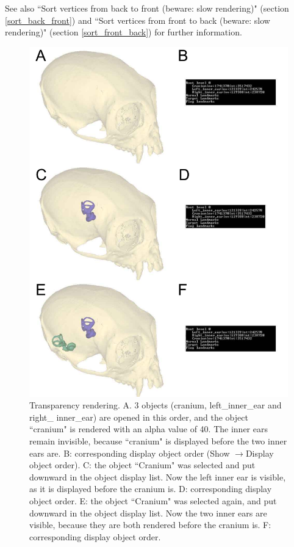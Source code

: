 See also ``Sort vertices from back to front (beware: slow rendering)"  (section \ref{sort_back_front}) and ``Sort vertices from front to back (beware: slow rendering)" (section \ref{sort_front_back}) for further information.\\

\begin{figure}
  \centering
  \includegraphics[scale=0.4]{images/Transparency/Transparency.pdf} 
	\caption{Transparency rendering. A. 3 objects (cranium, left\_inner\_ear and right\_
inner\_ear) are opened in this order, and the object ``cranium" is rendered with an alpha value of 40.
The inner ears remain invisible, because ``cranium" is displayed before the two inner ears are. B: corresponding display object order (Show $\rightarrow$Display
object order). C: the object ``Cranium" was selected and put downward in the object display list. Now the left inner ear is visible, as it is displayed before the cranium is. D: corresponding display object order. E: the object ``Cranium" was selected again, and put downward in the object display list. Now the two inner ears are
visible, because they are both rendered before the cranium is. F: corresponding display object order.}
\label{transparency}
 
\end{figure}




